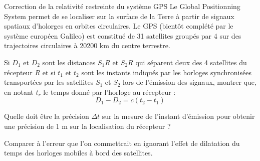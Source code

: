 \begin{exo}[PC][1][colle]{Correction de la relativité restreinte du système GPS}
Le Global Positionning System permet de se localiser sur la surface de la Terre à partir de signaux spatiaux d'holorges en orbites circulaires. Le GPS (bientôt complété par le système européen Galileo) est constitué de 31 satellites groupés par 4 sur des trajectoires circulaires à 20200 km du centre terrestre. 

\begin{quest}
  \item	
  Si $D_1$ et $D_2$ sont les distances $S_1 R$ et $S_2 R$ qui séparent deux des 4 satellites du récepteur $R$ et si $t_1$ et $t_2$ sont les instants indiqués par les horloges synchronisées transportées par les satellites $S_1$ et $S_2$ lors de l'émission des signaux, montrer que, en notant $t_r$ le temps donné par l'horloge au récepteur :
  \begin{equation}
  D_1-D_2=c\left(t_2-t_1\right)
  \end{equation}
    \item Quelle doit être la précision $\Delta t$ sur la mesure de l’instant d’émission pour obtenir une précision de 1 m sur la localisation du récepteur ?
    \item	Comparer à l'erreur que l'on commettrait en ignorant l'effet de dilatation du temps des horloges mobiles à bord des satellites.
\end{quest}
\end{exo}

